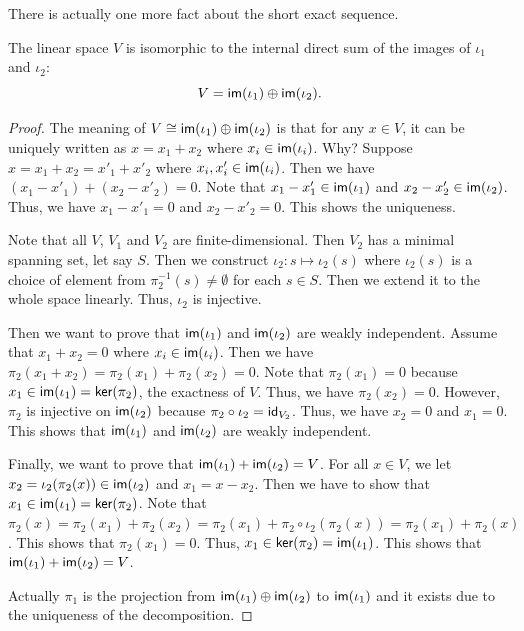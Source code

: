 There is actually one more fact about the short exact sequence.
\begin{proposition}
  The linear space $V$ is isomorphic to the internal direct sum of the images of $\iota_1$ and $\iota_2$:
  \[
    V = \im(\iota_1) \oplus \im(\iota_2).
  \]
\end{proposition}
\begin{proof}
  The meaning of $V \cong \im(\iota_1) \oplus \im(\iota_2)$ is that for any $x \in V$, it can be uniquely written as $x = x_1 + x_2$ where $x_i \in \im(\iota_i)$. Why? Suppose $x = x_1 + x_2 = x'_1 + x'_2$ where $x_i, x'_i \in \im(\iota_i)$. Then we have $(x_1 - x'_1) + (x_2 - x'_2) = 0$. Note that $x_1 - x'_1 \in \im(\iota_1)$ and $x_2 - x'_2 \in \im(\iota_2)$. Thus, we have $x_1 - x'_1 = 0$ and $x_2 - x'_2 = 0$. This shows the uniqueness.

  Note that all $V$, $V_1$ and $V_2$ are finite-dimensional. Then $V_2$ has a minimal spanning set, let say $S$. Then we construct $\iota_2 \colon s \mapsto \iota_2(s)$ where $\iota_2(s)$ is a choice of element from $\pi_2^{-1}(s) \neq \emptyset$ for each $s \in S$. Then we extend it to the whole space linearly. Thus, $\iota_2$ is injective.

  Then we want to prove that $\im(\iota_1)$ and $\im(\iota_2)$ are weakly independent. Assume that $x_1 + x_2 = 0$ where $x_i \in \im(\iota_i)$. Then we have $\pi_2(x_1 + x_2) = \pi_2(x_1) + \pi_2(x_2) = 0$. Note that $\pi_2(x_1) = 0$ because $x_1 \in \im(\iota_1) = \ker(\pi_2)$, the exactness of $V$. Thus, we have $\pi_2(x_2) = 0$. However, $\pi_2$ is injective on $\im(\iota_2)$ because $\pi_2 \circ \iota_2 = \id_{V_2}$. Thus, we have $x_2 = 0$ and $x_1 = 0$. This shows that $\im(\iota_1)$ and $\im(\iota_2)$ are weakly independent.

  Finally, we want to prove that $\im(\iota_1) + \im(\iota_2) = V$. For all $x \in V$, we let $x_2 = \iota_2(\pi_2(x)) \in \im(\iota_2)$ and $x_1 = x - x_2$. Then we have to show that $x_1 \in \im(\iota_1) = \ker(\pi_2)$. Note that $\pi_2(x) = \pi_2(x_1) + \pi_2(x_2) = \pi_2(x_1) + \pi_2 \circ \iota_2(\pi_2(x)) = \pi_2(x_1) + \pi_2(x)$. This shows that $\pi_2(x_1) = 0$. Thus, $x_1 \in \ker(\pi_2) = \im(\iota_1)$. This shows that $\im(\iota_1) + \im(\iota_2) = V$.

  Actually $\pi_1$ is the projection from $\im(\iota_1) \oplus \im(\iota_2)$ to $\im(\iota_1)$ and it exists due to the uniqueness of the decomposition.
\end{proof}

